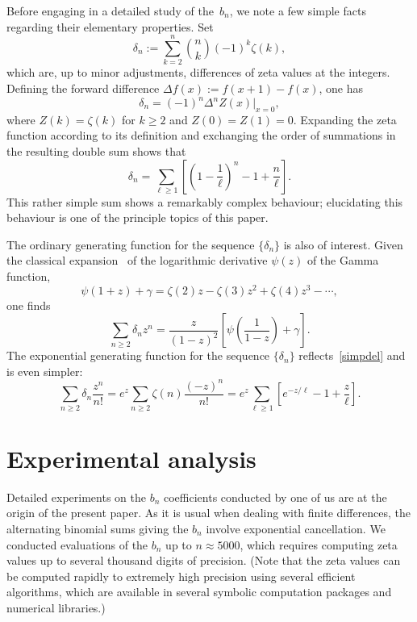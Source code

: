 \documentclass{amsart}
\begin{document}
Before engaging in a detailed study of the~$b_n$, we note a few 
simple facts regarding their elementary properties. Set
\begin{equation}\label{deldef}
\delta_n:=\sum_{k=2}^n \binom{n}{k} (-1)^k \zeta(k),
\end{equation}
which are, up to minor adjustments, differences of zeta values at the
integers.  Defining the forward difference $\Delta f(x):=f(x+1)-f(x)$,
one has
\[
\delta_n= (-1)^n \Delta^n Z(x) \bigg|_{x=0},\]
where $Z(k)=\zeta(k)$ for $k\ge2$ and $Z(0)=Z(1)=0$.
Expanding the zeta function according to its definition and 
exchanging the order of summations in the resulting double sum shows that
\begin{equation}\label{simpdel}
\delta_n = \sum_{\ell\ge1} \left[\left(1-\frac{1}{\ell}\right)^n-1+\frac{n}{\ell}\right].
\end{equation}
This rather simple sum shows a remarkably complex behaviour;
elucidating this behaviour is one of the principle topics of this paper.


The ordinary generating function for the sequence $\{\delta_n\}$ 
is also of interest.
Given the classical expansion~\cite{WhWa27} 
of the logarithmic derivative $\psi(z)$ of the Gamma function,
\[
\psi(1+z)+\gamma=\zeta(2)z-\zeta(3)z^2+\zeta(4)z^3-\cdots,
\]
one finds
\begin{equation}\label{delogf}
\sum_{n\ge2}\delta_n z^n =\frac{z}{(1-z)^2}\left[\psi\left(\frac{1}{1-z}\right)
+\gamma\right].
\end{equation}
The exponential generating function for the sequence  $\{\delta_n\}$ reflects~\eqref{simpdel} and is even simpler:
\begin{equation}\label{delegf}
\sum_{n\ge2}\delta_n \frac{z^n}{n!}
=e^z\sum_{n\ge2} \zeta(n) \frac{(-z)^n}{n!}=e^z \sum_{\ell\ge1}
\left[e^{-z/\ell}-1+\frac{z}{\ell}\right]
.
\end{equation}


\section{Experimental analysis}

Detailed experiments on the $b_n$ coefficients conducted by one of us are
at the origin of the present paper. As it is usual when dealing with finite differences,
the alternating binomial sums giving the $b_n$ involve exponential
cancellation. We conducted evaluations of the $b_n$ up to $n\approx 5000$,
which requires computing zeta values up to several thousand digits of precision.
(Note that the zeta values can be computed rapidly to extremely high
precision using several efficient algorithms, which are available in several
symbolic computation packages and numerical libraries.)
\end{document}
